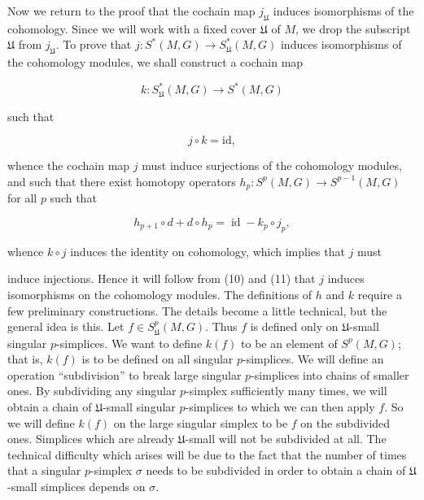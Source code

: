 Now we return to the proof that the cochain map $j_{\mathfrak{U}}$ induces isomorphisms of the cohomology. Since we will work with a fixed cover $\mathfrak{U}$ of $M$, we drop the subscript $\mathfrak{U}$ from $j_{\mathfrak{U}}$. To prove that $j\colon S^{*}(M,G)\to S_{\mathfrak{U}}^{*}(M,G)$ induces isomorphisms of the cohomology modules, we shall construct a cochain map

\begin{equation}
\tag{9}\label{eq:5.32:9}
k\colon S_{\mathfrak{U}}^{*}(M,G)\to S^{*}(M,G)
\end{equation}

such that

\begin{equation}
\tag{10}\label{eq:5.32:10}
j\circ k=\mathrm{id},
\end{equation}

whence the cochain map $j$ must induce surjections of the cohomology modules, and such that there exist homotopy operators $h_{p}\colon S^{p}(M,G)\to S^{p-1}(M,G)$ for all $p$ such that

\begin{equation}
\tag{11}\label{eq:5.32:11}
h_{p+1}\circ d+d\circ h_{p}=\operatorname{id}-k_{p}\circ j_{p},
\end{equation}

whence  $ k \circ j $ induces the identity on cohomology, which implies that $j$ must

induce injections. Hence it will follow from (10) and (11) that $j$ induces isomorphisms on the cohomology modules. The definitions of $h$ and $k$ require a few preliminary constructions. The details become a little technical, but the general idea is this. Let $f\in S_{\mathfrak{U}}^{p}(M,G)$. Thus $f$ is defined only on $\mathfrak{U}$-small singular $p$-simplices. We want to define $k(f)$ to be an element of $S^p(M,G)$; that is, $k(f)$ is to be defined on all singular $p$-simplices. We will define an operation “subdivision” to break large singular $p$-simplices into chains of smaller ones. By subdividing any singular $p$-simplex sufficiently many times, we will obtain a chain of $\mathfrak{U}$-small singular $p$-simplices to which we can then apply $f$. So we will define $k(f)$ on the large singular simplex to be $f$ on the subdivided ones. Simplices which are already $\mathfrak{U}$-small will not be subdivided at all. The technical difficulty which arises will be due to the fact that the number of times that a singular $p$-simplex $\sigma$ needs to be subdivided in order to obtain a chain of $\mathfrak{U}$-small simplices depends on $\sigma$.

